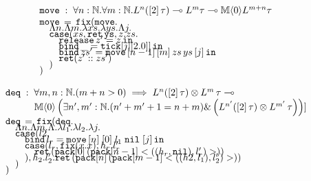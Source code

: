 $$
\begin{array}{l}
\texttt{move} \; : \; \forall n : \N. \forall m : \N. L^n([2] \, \tau) \loli L^m\tau \loli \M \langle 0 \rangle L^{m+n}\tau\\

\texttt{move} \, = \, \texttt{fix}(\texttt{move}.\\[-2mm]
\hspace{1em} \Lambda n. \Lambda m. \lambda xs. \lambda ys. \Lambda j.\\[-2mm]
\hspace{1em} \texttt{case}(xs,\texttt{ret} \, \texttt{ys},z.zs.\\[-2mm]
\hspace{2em} \texttt{release} \, z' = z \, \texttt{in}\\[-2mm]
\hspace{2em} \texttt{bind} \, \_ = \texttt{tick}[j|[2.0]]\, \texttt{in}\\[-2mm]
\hspace{2em} \texttt{bind} \, zs' = \texttt{move} \, [n-1]\, [m] \, zs \, ys \, [j] \, \texttt{in}\\[-2mm]
\hspace{2em} \texttt{ret}(z'::zs')\\[-2mm]
\hspace{1em})\\[-2mm]
)
\end{array}
$$

$$
\begin{array}{l}
\texttt{deq} \; : \; \forall m,n : \N. (m + n > 0) \implies L^n([2] \, \tau) \otimes L^m \, \tau \loli \\\hspace{3em}\M \langle 0 \rangle \left(\exists n',m' : \N. (n' + m' + 1 = n + m) \amp \left(L^{n'}([2] \, \tau) \otimes L^{m'} \, \tau\right)\right)]\\

\texttt{deq} \, = \, \texttt{fix}(\texttt{deq}.\\[-2mm]
\hspace{1em} \Lambda n. \Lambda m. \Lambda. \lambda l_1. \lambda l_2. \lambda j.\\[-2mm]
\hspace{1em} \texttt{case}(l2,\\[-2mm]
\hspace{2em} \texttt{bind} \, l_r = \texttt{move} \, [n] \; [0] \; l_1 \; \texttt{nil} \; [j] \, \texttt{in}\\[-2mm]
\hspace{2em} \texttt{case}(l_r,\texttt{fix}(x.x),h_r.l_r'\\[-2mm]
\hspace{3em} \texttt{ret}\left(\texttt{pack}[0]\left(\texttt{pack}[n-1] <((h_r,\texttt{nil}),l_r')>\right)\right)\\[-2mm]
\hspace{2em}), h_2.l_2'. \texttt{ret}\left(\texttt{pack}[n]\left(\texttt{pack}[m-1] <((h2,l_1),l_2')>\right)\right)\\[-2mm]
\hspace{1em})\\[-2mm]
)
\end{array}
$$

